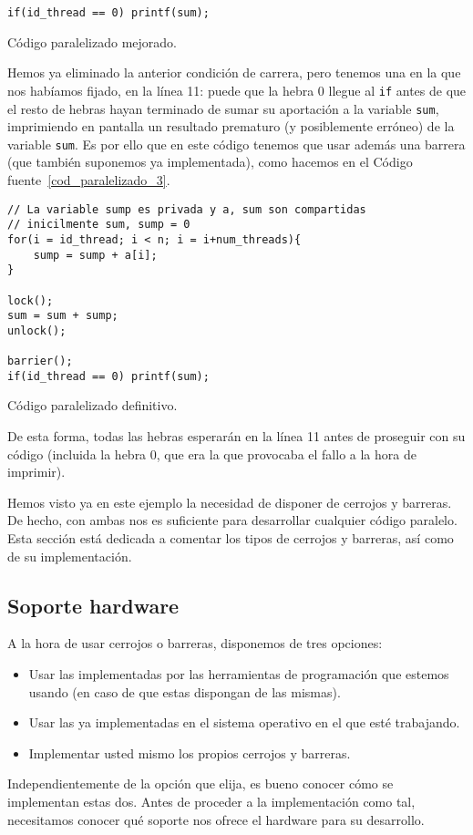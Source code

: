 \begin{ejemplo}
\begin{listing}[H]
\begin{verbatim}
if(id_thread == 0) printf(sum);
\end{verbatim}
\caption{Código paralelizado mejorado.}
\label{cod_paralelizado_2}
\end{listing}
Hemos ya eliminado la anterior condición de carrera, pero tenemos una en la que nos habíamos fijado, en la línea 11: puede que la hebra 0 llegue al \verb|if| antes de que el resto de hebras hayan terminado de sumar su aportación a la variable \verb|sum|, imprimiendo en pantalla un resultado prematuro (y posiblemente erróneo) de la variable \verb|sum|. Es por ello que en este código tenemos que usar además una barrera (que también suponemos ya implementada), como hacemos en el Código fuente~\ref{cod_paralelizado_3}.
\begin{listing}[H]
\centering
\begin{verbatim}
// La variable sump es privada y a, sum son compartidas
// inicilmente sum, sump = 0
for(i = id_thread; i < n; i = i+num_threads){
    sump = sump + a[i];
}

lock();
sum = sum + sump;
unlock();

barrier();
if(id_thread == 0) printf(sum);
\end{verbatim}
\caption{Código paralelizado definitivo.}
\label{cod_paralelizado_3}
\end{listing}

De esta forma, todas las hebras esperarán en la línea 11 antes de proseguir con su código (incluida la hebra 0, que era la que provocaba el fallo a la hora de imprimir).
\end{ejemplo}
Hemos visto ya en este ejemplo la necesidad de disponer de cerrojos y barreras. De hecho, con ambas nos es suficiente para desarrollar cualquier código paralelo. Esta sección está dedicada a comentar los tipos de cerrojos y barreras, así como de su implementación.

\subsection{Soporte hardware}
A la hora de usar cerrojos o barreras, disponemos de tres opciones:
\begin{itemize}
    \item Usar las implementadas por las herramientas de programación que estemos usando (en caso de que estas dispongan de las mismas).
    \item Usar las ya implementadas en el sistema operativo en el que esté trabajando.
    \item Implementar usted mismo los propios cerrojos y barreras.
\end{itemize}
Independientemente de la opción que elija, es bueno conocer cómo se implementan estas dos. Antes de proceder a la implementación como tal, necesitamos conocer qué soporte nos ofrece el hardware para su desarrollo.\\


